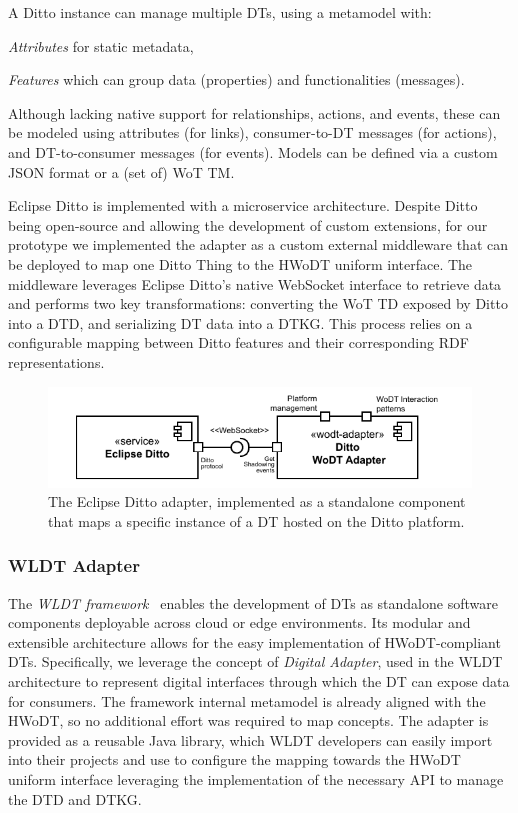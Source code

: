 A Ditto instance can manage multiple \acp{DT}, using a metamodel with:
\begin{inlinelist}
    \item \emph{Attributes} for static metadata,
    \item \emph{Features} which can group data (properties) and functionalities (messages).
\end{inlinelist}
Although lacking native support for relationships, actions, and events, these can be modeled using attributes (for links), consumer-to-\ac{DT} messages (for actions), and \ac{DT}-to-consumer messages (for events). Models can be defined via a custom JSON format or a (set of) \ac{WoT} \ac{TM}.

Eclipse Ditto is implemented with a microservice architecture. 
Despite Ditto being open-source and allowing the development of custom extensions, for our prototype we implemented the adapter as a custom external middleware that can be deployed to map one Ditto Thing to the \ac{HWoDT} uniform interface.
%
The middleware leverages Eclipse Ditto’s native WebSocket interface to retrieve data and performs two key transformations: converting the \ac{WoT} \ac{TD} exposed by Ditto into a \ac{DTD}, and serializing \ac{DT} data into a \ac{DTKG}.
This process relies on a configurable mapping between Ditto features and their corresponding \ac{RDF} representations.

\begin{figure}[ht]
  \centering
  \includegraphics[width=0.8\columnwidth]{figures/hwodt/ditto-adapter-c&c.pdf}
  \caption{The Eclipse Ditto adapter, implemented as a standalone component that maps a specific instance of a \ac{DT} hosted on the Ditto platform.}
  \label{fig:ditto-adapter-c&c}
\end{figure}

\subsubsection{\acl{WLDT} Adapter}

The \emph{\acf{WLDT} framework}~\cite{picone2021wldt} enables the development of \acp{DT} as standalone software components deployable across cloud or edge environments.
Its modular and extensible architecture allows for the easy implementation of \ac{HWoDT}-compliant \acp{DT}.
Specifically, we leverage the concept of \emph{Digital Adapter}, used in the \ac{WLDT} architecture to represent digital interfaces through which the \ac{DT} can expose data for consumers.
%
The framework internal metamodel is already aligned with the \ac{HWoDT}, so no additional effort was required to map concepts.
The adapter is provided as a reusable Java library, which \ac{WLDT} developers can easily import into their projects and use to configure the mapping towards the \ac{HWoDT} uniform interface leveraging the implementation of the necessary \ac{API} to manage the \ac{DTD} and \ac{DTKG}.

